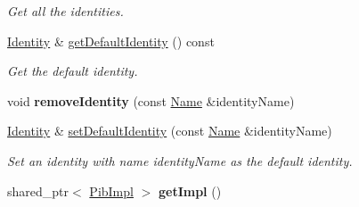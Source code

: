 \begin{DoxyCompactItemize}
\begin{DoxyCompactList}\small\item\em Get all the identities. \end{DoxyCompactList}\item 
\hyperlink{classndn_1_1security_1_1Identity}{Identity} \& \hyperlink{classndn_1_1security_1_1Pib_a0325f3cd4c292fc3267a3dae4bc3134d}{get\+Default\+Identity} () const
\begin{DoxyCompactList}\small\item\em Get the default identity. \end{DoxyCompactList}\item 
void {\bfseries remove\+Identity} (const \hyperlink{classndn_1_1Name}{Name} \&identity\+Name)\hypertarget{classndn_1_1security_1_1Pib_a111de1c03f633a037b404b20c0d2e307}{}\label{classndn_1_1security_1_1Pib_a111de1c03f633a037b404b20c0d2e307}

\item 
\hyperlink{classndn_1_1security_1_1Identity}{Identity} \& \hyperlink{classndn_1_1security_1_1Pib_aa6c85b0bf73c86ace00c45f1fb22ad06}{set\+Default\+Identity} (const \hyperlink{classndn_1_1Name}{Name} \&identity\+Name)
\begin{DoxyCompactList}\small\item\em Set an identity with name {\ttfamily identity\+Name} as the default identity. \end{DoxyCompactList}\item 
shared\+\_\+ptr$<$ \hyperlink{classndn_1_1security_1_1PibImpl}{Pib\+Impl} $>$ {\bfseries get\+Impl} ()\hypertarget{classndn_1_1security_1_1Pib_aeff1b4dcbcafc8cb21a8628ec2a5f9b9}{}\label{classndn_1_1security_1_1Pib_aeff1b4dcbcafc8cb21a8628ec2a5f9b9}

\end{DoxyCompactItemize}
